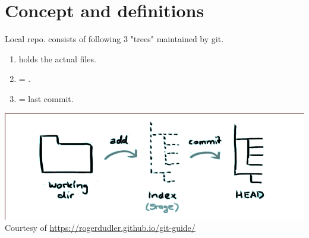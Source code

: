 \section{Concept and definitions}\label{sec:git}
Local repo. consists of following 3 "trees" maintained by git.
\begin{enumerate}\packed
\item {} holds the actual files.
\item {} = .
\item {} = last commit.
\end{enumerate}
\begin{center}
	\includegraphics[trim=.5in 0in 0in 0.2in, clip=true,
	keepaspectratio=true, width=.6\textwidth]{./img/trees.png}
	\nl Courtesy of \url{https://rogerdudler.github.io/git-guide/}
\end{center}